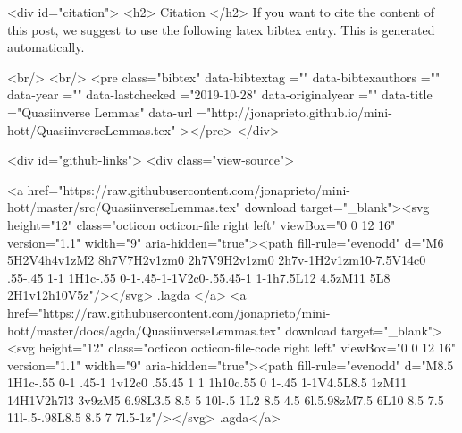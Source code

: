   
  <div id="citation">
  <h2> Citation </h2>
  If you want to cite the content of this post,
  we suggest to use the following latex bibtex entry.
  This is generated automatically.

  <br/>
  <br/>
  <pre class="bibtex"
       data-bibtextag =""
       data-bibtexauthors =""
       data-year =""
       data-lastchecked ="2019-10-28"
       data-originalyear =""
       data-title ="Quasiinverse Lemmas"
       data-url ="http://jonaprieto.github.io/mini-hott/QuasiinverseLemmas.tex"
  ></pre>
  </div>
  

  <div id="github-links">
    <div class="view-source">
      
        <a href="https://raw.githubusercontent.com/jonaprieto/mini-hott/master/src/QuasiinverseLemmas.tex" download target="_blank"><svg height="12" class="octicon octicon-file right left" viewBox="0 0 12 16" version="1.1" width="9" aria-hidden="true"><path fill-rule="evenodd" d="M6 5H2V4h4v1zM2 8h7V7H2v1zm0 2h7V9H2v1zm0 2h7v-1H2v1zm10-7.5V14c0 .55-.45 1-1 1H1c-.55 0-1-.45-1-1V2c0-.55.45-1 1-1h7.5L12 4.5zM11 5L8 2H1v12h10V5z"/></svg> .lagda </a>
        <a href="https://raw.githubusercontent.com/jonaprieto/mini-hott/master/docs/agda/QuasiinverseLemmas.tex" download target="_blank"><svg height="12" class="octicon octicon-file-code right left" viewBox="0 0 12 16" version="1.1" width="9" aria-hidden="true"><path fill-rule="evenodd" d="M8.5 1H1c-.55 0-1 .45-1 1v12c0 .55.45 1 1 1h10c.55 0 1-.45 1-1V4.5L8.5 1zM11 14H1V2h7l3 3v9zM5 6.98L3.5 8.5 5 10l-.5 1L2 8.5 4.5 6l.5.98zM7.5 6L10 8.5 7.5 11l-.5-.98L8.5 8.5 7 7l.5-1z"/></svg> .agda</a>
      
